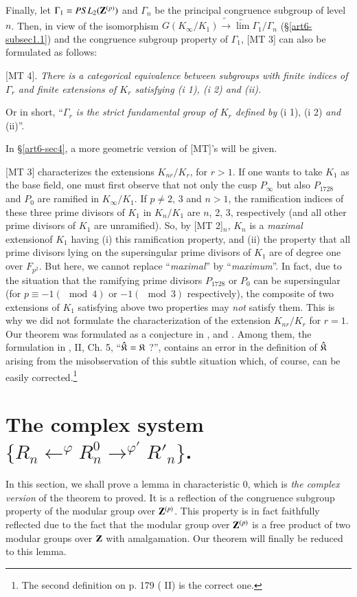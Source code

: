 Finally, let $\Gamma_1 = PSL_2 (\mathbf{Z}^{(p)})$ and $\Gamma_n$ be the principal congruence subgroup of level $n$. Then, in view of the isomorphism $G (K_\infty/ K_1) \tilde{\to} \underleftarrow{\lim} \Gamma_1 / \Gamma_n$ (\S \ref{art6-subsec1.1}) and the congruence subgroup property of $\Gamma_1$, [MT 3] can also be formulated as follows:

[MT 4]. \textit{There is a categorical equivalence between subgroups with finite indices of $\Gamma_r$ and finite extensions of $K_r$ satisfying (i 1), (i 2) and (ii).}

Or in short,  ``\textit{$\Gamma_r$ is the strict fundamental group of $K_r$ defined by} (i 1), (i 2) {\it and} (ii)''.

In \S \ref{art6-sec4}, a more geometric version of [MT]'s will be given. 


\begin{remark}\label{art6-rem3}
[MT 3] characterizes the extensions $K_{nr}/ K_r$, for $r > 1$. If one wants to take $K_1$ as the base field, one must first observe that not only the cusp $P_\infty$ but also $P_{1728}$ and $P_0$ are ramified in $K_\infty/ K_1$. If $p\neq 2$, 3 and $n >1$, the ramification indices of these three prime divisors of $K_1$ in $K_n/K_1$ are $n$, 2, 3, respectively (and all other prime divisors of $K_1$ are unramified). So, by [MT 2]$_n$, $K_n$ is a \textit{maximal} extension\pageoriginale of $K_1$ having (i) this ramification property, and (ii) the property that all prime divisors lying on the supersingular prime divisors of $K_1$ are of degree one over $F_{p^2}$. But here, we cannot replace ``\textit{maximal}'' by ``\textit{maximum}''. In fact, due to the situation that the ramifying prime divisors $P_{1728}$ or $P_0$ can be supersingular (for  $p\equiv -1 (\mod 4)$ or $-1 (\mod 3)$ respectively), the composite of two extensions of $K_1$ satisfying above two properties may \textit{not} satisfy them. This is why we did not formulate the characterization of the extension $K_{nr}/K_r$ for $r =1$. Our theorem was formulated as a conjecture in \cite{art6-key7}, \cite{art6-key8} and \cite{art6-key9}. Among them, the formulation in \cite{art6-key8}, II, Ch. 5, ``$\hat{\mathfrak{K}} = \mathfrak{K}$ ?'', contains an error in the definition of $\hat{\mathfrak{K}}$ arising from the misobservation of this subtle situation which, of course, can be easily corrected.\footnote{The second definition on p. 179 (\cite{art6-key8} II) is the correct one.}
\end{remark}

\section{The complex system $\{R_n {\displaystyle{\mathop{\longleftarrow}^\varphi}} R^0_n  {\displaystyle{\mathop{\longrightarrow}^{\varphi'}}} R'_n \}$.}\label{art6-sec3}
In this section, we shall prove a lemma in characteristic 0, which is \textit{the complex version} of the theorem to proved. It is a reflection of the congruence subgroup property of the modular group over $\mathbf{Z}^{(p)}$. This property is in fact faithfully reflected due to the fact that the modular group over $\mathbf{Z}^{(p)}$ is a free product of two modular groups over $\mathbf{Z}$ with amalgamation. Our theorem will finally be reduced to this lemma.

